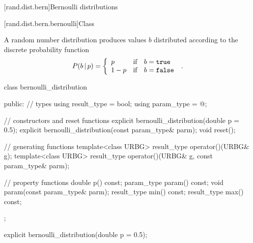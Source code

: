 
[rand.dist.bern]{Bernoulli distributions}%
%
%


[rand.dist.bern.bernoulli]{Class }%
%
%

\pnum
A  random number distribution
produces  values $b$
distributed according to
the discrete probability function
%
%
\[%
 P(b\,|\,p)
      = \left\{ \begin{array}{lcl}
          p    &  \mbox{if} & b = \tcode{true} \\
          1-p  &  \mbox{if} & b = \tcode{false}
        \end{array}\right.
\; \mbox{.}
\]

%
\begin{codeblock}
class bernoulli_distribution
{
public:
 // types
 using result_type = bool;
 using param_type  = @\unspec@;

 // constructors and reset functions
 explicit bernoulli_distribution(double p = 0.5);
 explicit bernoulli_distribution(const param_type& parm);
 void reset();

 // generating functions
 template<class URBG>
   result_type operator()(URBG& g);
 template<class URBG>
   result_type operator()(URBG& g, const param_type& parm);

 // property functions
 double p() const;
 param_type param() const;
 void param(const param_type& parm);
 result_type min() const;
 result_type max() const;
};
\end{codeblock}


%
\begin{itemdecl}
explicit bernoulli_distribution(double p = 0.5);
\end{itemdecl}

